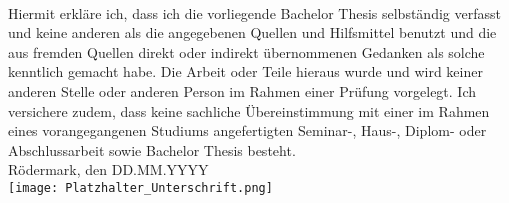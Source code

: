 \\
Hiermit erkläre ich, dass ich die vorliegende Bachelor Thesis selbständig verfasst und keine anderen als die angegebenen Quellen und Hilfsmittel benutzt und die aus fremden Quellen direkt oder indirekt übernommenen Gedanken als solche kenntlich gemacht habe. Die Arbeit oder Teile hieraus wurde und wird keiner anderen Stelle oder anderen Person im Rahmen einer Prüfung vorgelegt. Ich versichere zudem, dass keine sachliche Übereinstimmung mit einer im Rahmen eines vorangegangenen Studiums angefertigten Seminar-, Haus-, Diplom- oder Abschlussarbeit sowie Bachelor Thesis besteht.
\\ [1.2em]
Rödermark, den DD.MM.YYYY%
\\ [1.2em]
\texttt{[image: Platzhalter\_Unterschrift.png]}%